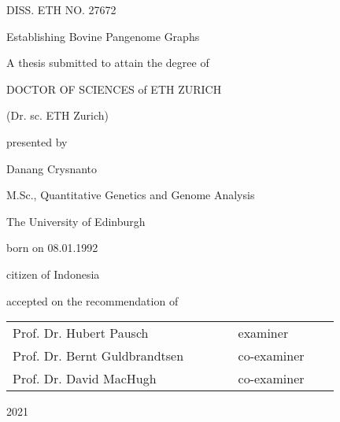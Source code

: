 \documentclass[../main.tex]{subfiles}
\begin{document}
\setlength{\parskip}{0pt}
\begin{center}
    \thispagestyle{empty}

    DISS. ETH NO. 27672

    \vspace{2cm}

    \doublespacing
    
    {\LARGE Establishing Bovine Pangenome Graphs}
    

    \vspace{2cm}
    
    
    A thesis submitted to attain the degree of

    DOCTOR OF SCIENCES of ETH ZURICH

    (Dr. sc. ETH Zurich)
    \vspace{1cm}

    presented by

    \vspace{1cm}
    Danang Crysnanto  

    \vspace{1cm}

    M.Sc., Quantitative Genetics and Genome Analysis 
    
    The University of Edinburgh

    \vspace{1cm}

    born on 08.01.1992

    citizen of Indonesia

    \vspace{1.5cm}

    accepted on the recommendation of \\

        \begin{tabular}{ll}
        Prof. Dr. Hubert Pausch~ ~ ~ ~ ~ ~ ~ & examiner         \\
        Prof. Dr. Bernt Guldbrandtsen~ ~ ~ ~ & co-examiner~ ~~  \\
        Prof. Dr. David MacHugh~ ~ ~ ~ ~ ~ ~ & co-examiner     
        \end{tabular}


    \vspace{2cm}
    2021
\end{center}
\end{document}
